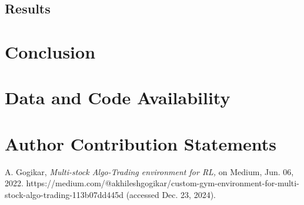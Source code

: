 \documentclass[conference]{IEEEtran}
\begin{document}

\subsection{Results}


\section{Conclusion}


\section{Data and Code Availability}


\section{Author Contribution Statements}


\begin{thebibliography}{0}
 
    A. Gogikar, \emph{Multi-stock Algo-Trading environment for RL,} on Medium, Jun. 06, 2022. https://medium.com/@akhileshgogikar/custom-gym-environment-for-multi-stock-algo-trading-113b07dd445d (accessed Dec. 23, 2024).

\end{thebibliography}
\end{document}
